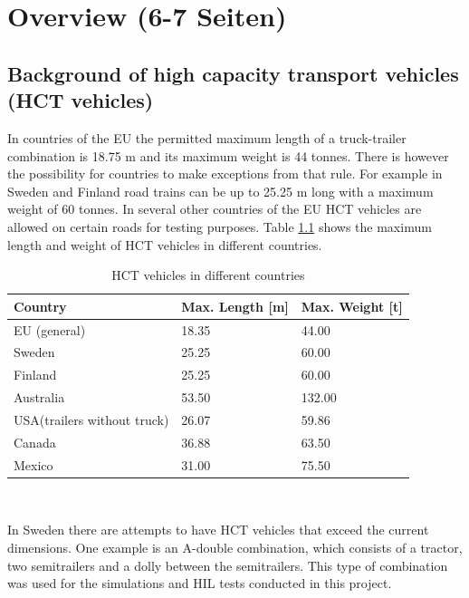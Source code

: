 \documentclass[ExampleMasters.tex]{subfiles}
\begin{document}
\clearpage
{\pagestyle{empty}\cleardoublepage}%
\chapter{Overview (6-7 Seiten)}
\label{chap:overview}


\section{Background of high capacity transport vehicles (HCT vehicles)}
\label{sec:legal_situation}

In countries of the EU the permitted maximum length of a truck-trailer combination is 18.75 m and its maximum weight is 44 tonnes. There is however the possibility for countries to make exceptions from that rule.\cite{96/53/EC}  For example in Sweden and Finland road trains can be up to 25.25 m long with a  maximum weight of 60 tonnes.\cite{Vaegverket}
In several other countries of the EU \gls{HCT} vehicles are allowed on certain roads for testing purposes. 
Table \ref{tab:HCT_vehicles_in_different_countries} shows the maximum length and weight of \gls{HCT} vehicles in different countries.

\begin{table}[!htb]
	\centering
	\caption{\gls{HCT} vehicles in different countries\cite{Vaegverket}\cite{HCT_vehicles_Australia}\Cite{HCT_vehicles_USA}\cite{HCT_vehicles_Canada}\Cite{HCT_vehicles_Mexico}}
	\label{tab:HCT_vehicles_in_different_countries}
	\begin{tabular}{l|l|l|}
		Country   & Max. Length [m] & Max. Weight [t] \\ \hline
		EU (general) & 18.35 & 44.00\\
		Sweden    &       25.25      &       60.00      \\
		Finland   &            25.25 &         60.00    \\
		Australia &      53.50       &           132.00  \\
		USA(trailers without truck)&      26.07       &    59.86        \\
		Canada & 36.88 & 63.50 \\
		Mexico & 31.00 & 75.50 \\
	\end{tabular} \\
\end{table}
In Sweden there are attempts to have \gls{HCT} vehicles that exceed the current dimensions. One example is an A-double combination, which consists of a tractor, two semitrailers and a dolly between the semitrailers. This type of combination was used for the simulations and \gls{HIL} tests conducted in this project.\\
\end{document}
